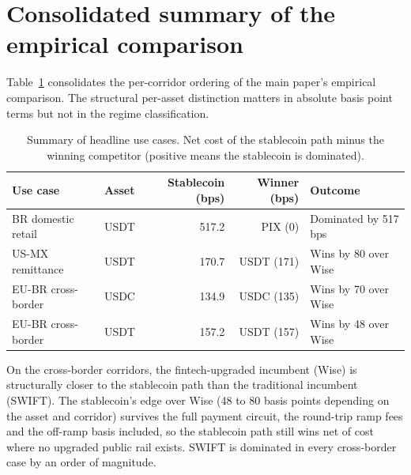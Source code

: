\section{Consolidated summary of the empirical comparison}\label{ia:summary_uc}

Table~\ref{tab:summary_uc} consolidates the per-corridor ordering of the main paper's empirical comparison. The structural per-asset distinction matters in absolute basis point terms but not in the regime classification.

\begin{table}[H]
\centering
\caption{Summary of headline use cases. Net cost of the stablecoin path minus the winning competitor (positive means the stablecoin is dominated).}\label{tab:summary_uc}
\begin{tabular}{llrrl}
\toprule
Use case & Asset & Stablecoin (bps) & Winner (bps) & Outcome \\
\midrule
BR domestic retail    & USDT & 517.2 & PIX (0)          & Dominated by 517 bps \\
US-MX remittance      & USDT & 170.7 & USDT (171)       & Wins by 80 over Wise \\
EU-BR cross-border    & USDC & 134.9 & USDC (135)       & Wins by 70 over Wise \\
EU-BR cross-border    & USDT & 157.2 & USDT (157)       & Wins by 48 over Wise \\
\bottomrule
\end{tabular}
\end{table}

On the cross-border corridors, the fintech-upgraded incumbent (Wise) is structurally closer to the stablecoin path than the traditional incumbent (SWIFT). The stablecoin's edge over Wise (48 to 80 basis points depending on the asset and corridor) survives the full payment circuit, the round-trip ramp fees and the off-ramp basis included, so the stablecoin path still wins net of cost where no upgraded public rail exists. SWIFT is dominated in every cross-border case by an order of magnitude.
